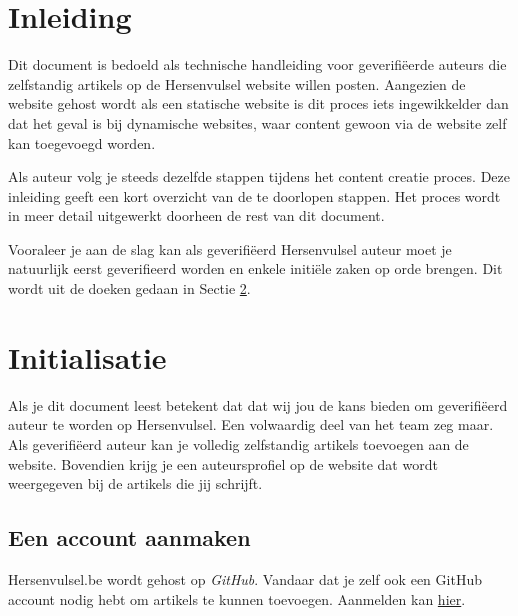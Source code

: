 \documentclass[12pt]{article}
\begin{document}
\section{Inleiding} 
Dit document is bedoeld als technische handleiding voor geverifiëerde auteurs die zelfstandig artikels op de Hersenvulsel website willen posten. Aangezien de website gehost wordt als een statische website is dit proces iets ingewikkelder dan dat het geval is bij dynamische websites, waar content gewoon via de website zelf kan toegevoegd worden.

Als auteur volg je steeds dezelfde stappen tijdens het content creatie proces. Deze inleiding geeft een kort overzicht van de te doorlopen stappen. Het proces wordt in meer detail uitgewerkt doorheen de rest van dit document.

Vooraleer je aan de slag kan als geverifiëerd Hersenvulsel auteur moet je natuurlijk eerst geverifieerd worden en enkele initiële zaken op orde brengen. Dit wordt uit de doeken gedaan in Sectie \ref{sec:init}.


\newpage






\section{Initialisatie}\label{sec:init}
Als je dit document leest betekent dat dat wij jou de kans bieden om geverifiëerd auteur te worden op Hersenvulsel. Een volwaardig deel van het team zeg maar. Als geverifiëerd auteur kan je volledig zelfstandig artikels toevoegen aan de website. Bovendien krijg je een auteursprofiel op de website dat wordt weergegeven bij de artikels die jij schrijft.

\begin{figure}[H] %
\label{fig:auteur}
\end{figure}


\subsection{Een account aanmaken}
Hersenvulsel.be wordt gehost op \emph{GitHub}. Vandaar dat je zelf ook een GitHub account nodig hebt om artikels te kunnen toevoegen. Aanmelden kan \href{https://github.com/join}{hier}.
\end{document}
